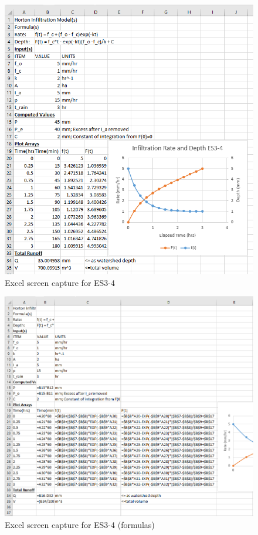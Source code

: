 \documentclass[12pt]{article}
\begin{document}
\begin{enumerate}
\begin{figure}[h!] %
   \centering
   \includegraphics[width=6in]{es3-4xls.png} 
   \caption{Excel screen capture for ES3-4}
   \label{fig:es3-4xls}
\end{figure}
\clearpage
\begin{figure}[h!] %
   \centering
   \includegraphics[width=6in]{es3-4func.png} 
   \caption{Excel screen capture for ES3-4 (formulas)}
   \label{fig:es3-4func}
\end{figure}


\end{enumerate}
\end{document}
